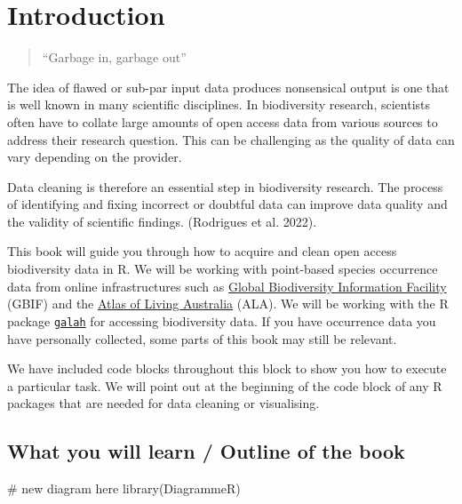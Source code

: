 \documentclass[
  letterpaper,
  DIV=11,
  numbers=noendperiod,
  oneside]{scrreprt}
\newenvironment{Shaded}{\begin{snugshade}}{\end{snugshade}}
\newcommand{\CommentTok}[1]{\textcolor[rgb]{0.37,0.37,0.37}{#1}}
\newcommand{\FunctionTok}[1]{\textcolor[rgb]{0.28,0.35,0.67}{#1}}
\newcommand{\NormalTok}[1]{\textcolor[rgb]{0.00,0.23,0.31}{#1}}
\begin{document}

\hypertarget{introduction}{%
\chapter{Introduction}\label{introduction}}

\begin{quote}
``Garbage in, garbage out''
\end{quote}

The idea of flawed or sub-par input data produces nonsensical output is
one that is well known in many scientific disciplines. In biodiversity
research, scientists often have to collate large amounts of open access
data from various sources to address their research question. This can
be challenging as the quality of data can vary depending on the
provider.

Data cleaning is therefore an essential step in biodiversity research.
The process of identifying and fixing incorrect or doubtful data can
improve data quality and the validity of scientific findings. (Rodrigues
et al. 2022).

This book will guide you through how to acquire and clean open access
biodiversity data in R. We will be working with point-based species
occurrence data from online infrastructures such as
\href{https://www.gbif.org/}{Global Biodiversity Information Facility}
(GBIF) and the \href{https://www.ala.org.au/}{Atlas of Living Australia}
(ALA). We will be working with the R package
\href{https://galah.ala.org.au/}{\texttt{galah}} for accessing
biodiversity data. If you have occurrence data you have personally
collected, some parts of this book may still be relevant.

We have included code blocks throughout this block to show you how to
execute a particular task. We will point out at the beginning of the
code block of any R packages that are needed for data cleaning or
visualising.

\hypertarget{what-you-will-learn-outline-of-the-book}{%
\section{What you will learn / Outline of the
book}\label{what-you-will-learn-outline-of-the-book}}

\begin{Shaded}
\begin{Highlighting}[]
\CommentTok{\# new diagram here}
\FunctionTok{library}\NormalTok{(DiagrammeR)}
\end{Highlighting}
\end{Shaded}
\end{document}
